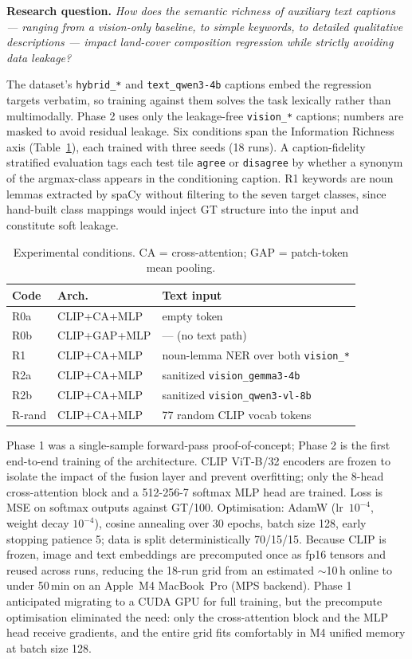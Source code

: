 \documentclass[conference]{IEEEtran}
\begin{document}
\textbf{Research question.} \emph{How does the semantic richness of
auxiliary text captions --- ranging from a vision-only baseline, to simple
keywords, to detailed qualitative descriptions --- impact land-cover
composition regression while strictly avoiding data leakage?}

The dataset's \texttt{hybrid\_*} and \texttt{text\_qwen3-4b} captions
embed the regression targets verbatim, so training against them solves the
task lexically rather than multimodally. Phase 2 uses only the leakage-free
\texttt{vision\_*} captions; numbers are masked to avoid residual leakage.
Six conditions span the Information Richness axis
(Table~\ref{tab:conditions}), each trained with three seeds (18 runs).
A caption-fidelity stratified evaluation tags each test tile
\texttt{agree} or \texttt{disagree} by whether a synonym of the
argmax-class appears in the conditioning caption. R1 keywords are noun
lemmas extracted by spaCy without filtering to the seven target classes,
since hand-built class mappings would inject GT structure into the input
and constitute soft leakage.

\begin{table}[ht]
\centering
\footnotesize
\caption{Experimental conditions. CA = cross-attention; GAP = patch-token mean
pooling.}
\label{tab:conditions}
\begin{tabular}{@{}lll@{}}
\toprule
\textbf{Code} & \textbf{Arch.} & \textbf{Text input} \\
\midrule
R0a    & CLIP+CA+MLP  & empty token \\
R0b    & CLIP+GAP+MLP & --- (no text path) \\
R1     & CLIP+CA+MLP  & noun-lemma NER over both \texttt{vision\_*} \\
R2a    & CLIP+CA+MLP  & sanitized \texttt{vision\_gemma3-4b} \\
R2b    & CLIP+CA+MLP  & sanitized \texttt{vision\_qwen3-vl-8b} \\
R-rand & CLIP+CA+MLP  & 77 random CLIP vocab tokens \\
\bottomrule
\end{tabular}
\end{table}

Phase 1 was a single-sample forward-pass proof-of-concept; Phase 2 is
the first end-to-end training of the architecture. CLIP ViT-B/32 encoders
are frozen to isolate the impact of the fusion layer and prevent
overfitting; only the 8-head cross-attention block and a 512-256-7 softmax
MLP head are trained. Loss is MSE on softmax outputs against GT/100.
Optimisation: AdamW (lr~$10^{-4}$, weight decay $10^{-4}$), cosine
annealing over 30 epochs, batch size 128, early stopping patience 5; data
is split deterministically 70/15/15. Because CLIP is frozen, image and
text embeddings are precomputed once as fp16 tensors and reused across
runs, reducing the 18-run grid from an estimated $\sim$10\,h online to
under 50\,min on an Apple~M4 MacBook~Pro (MPS backend). Phase 1
anticipated migrating to a CUDA GPU for full training, but the precompute
optimisation eliminated the need: only the cross-attention block and the
MLP head receive gradients, and the entire grid fits comfortably in M4
unified memory at batch size 128.
\end{document}
